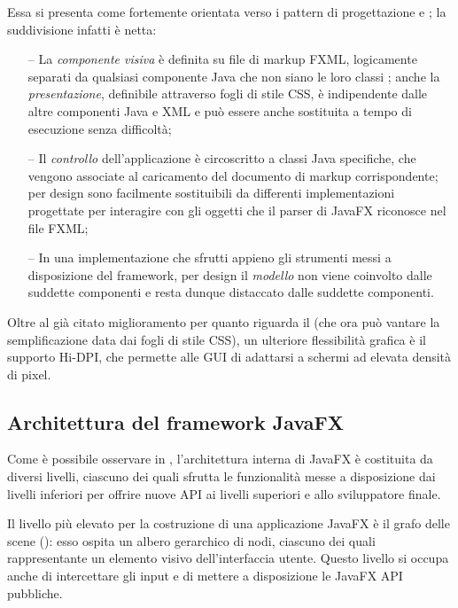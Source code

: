             Essa si presenta come fortemente orientata verso i pattern di progettazione  e ; la suddivisione infatti è netta:
            \begin{itemize}
                \item[--] La \emph{componente visiva} è definita su file di markup FXML, logicamente separati da qualsiasi componente Java che non siano le loro classi ; anche la \emph{presentazione}, definibile attraverso fogli di stile CSS, è indipendente dalle altre componenti Java e XML e può essere anche sostituita a tempo di esecuzione senza difficoltà;
                \item[--] Il \emph{controllo} dell'applicazione è circoscritto a classi Java specifiche, che vengono associate al caricamento del documento di markup corrispondente; per design sono facilmente sostituibili da differenti implementazioni progettate per interagire con gli oggetti che il parser di JavaFX riconosce nel file FXML;
                \item[--] In una implementazione che sfrutti appieno gli strumenti messi a disposizione del framework, per design il \emph{modello} non viene coinvolto dalle suddette componenti e resta dunque distaccato dalle suddette componenti.
            \end{itemize}

            Oltre al già citato miglioramento per quanto riguarda il  (che ora può vantare la semplificazione data dai fogli di stile CSS), un ulteriore flessibilità grafica è il supporto Hi-DPI, che permette alle GUI di adattarsi a schermi ad elevata densità di pixel.

        \subsection{Architettura del framework JavaFX}\label{sub:jfxFramework}
            Come è possibile osservare in , l'architettura interna di JavaFX è costituita da diversi livelli, ciascuno dei quali sfrutta le funzionalità messe a disposizione dai livelli inferiori per offrire nuove API ai livelli superiori e allo sviluppatore finale.

            Il livello più elevato per la costruzione di una applicazione JavaFX è il grafo delle scene (): esso ospita un albero gerarchico di nodi, ciascuno dei quali rappresentante un elemento visivo dell'interfaccia utente. Questo livello si occupa anche di intercettare gli input e di mettere a disposizione le JavaFX API pubbliche.


